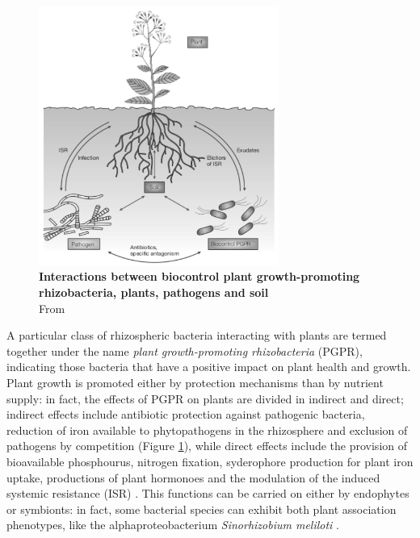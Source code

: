 \begin{figure}[!t]
	\center
    \includegraphics[width=0.7\textwidth]{figures/Introduction/thesis_15}
	\caption{\label{fig:plantprotection}\textbf{Interactions between biocontrol plant growth-promoting rhizobacteria, plants, pathogens and soil}\\
			From \cite{haas2005biological}}
\end{figure}

A particular class of rhizospheric bacteria interacting with plants are termed together under the name \textit{plant growth-promoting rhizobacteria} (PGPR), indicating those bacteria that have a positive impact on plant health and growth. Plant growth is promoted either by protection mechanisms than by nutrient supply: in fact, the  effects of PGPR on plants are divided in indirect and direct; indirect effects include antibiotic protection against pathogenic bacteria, reduction of iron available to phytopathogens in the rhizosphere and exclusion of pathogens by competition (Figure \ref{fig:plantprotection}), while direct effects include the provision of bioavailable phosphourus, nitrogen fixation, syderophore production for plant iron uptake, productions of plant hormonoes and the modulation of the induced systemic resistance (ISR) \cite{vessey2003plant}\cite{lucy2004applications}. This functions can be carried on either by endophytes or symbionts: in fact, some bacterial species can exhibit both plant association phenotypes, like the alphaproteobacterium \textit{Sinorhizobium meliloti} \cite{pini2012exploring}.


